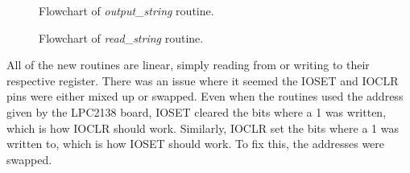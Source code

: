 \documentclass[letterpaper,10pt]{article}
\begin{document}
    \begin{figure}[p]
        
        \caption{Flowchart of \textit{output\_string} routine.}
        \label{flo:output_string}
    \end{figure}

    \begin{figure}[p]
        
        \caption{Flowchart of \textit{read\_string} routine.}
        \label{flo:read_string}
    \end{figure}

    All of the new routines are linear, simply reading from or writing to
    their respective register. There was an issue where it seemed the
    IOSET and IOCLR pins were either mixed up or swapped. Even when the
    routines used the address given by the LPC2138 board, IOSET cleared
    the bits where a 1 was written, which is how IOCLR should work.
    Similarly, IOCLR set the bits where a 1 was written to, which is how
    IOSET should work. To fix this, the addresses were swapped.
\end{document}
